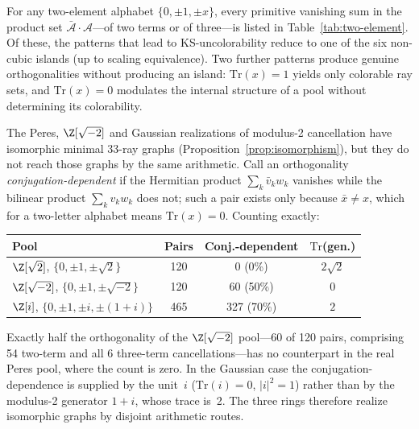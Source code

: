 
\begin{observation}\label{obs:two-element}
For any two-element alphabet $\{0, \pm 1, \pm x\}$, every primitive vanishing sum
in the product set $\bar{\mathcal{A}} \cdot \mathcal{A}$---of two terms or of
three---is listed in Table~\ref{tab:two-element}.  Of these, the patterns that
lead to KS-uncolorability reduce to one of the six non-cubic islands (up to
scaling equivalence).  Two further patterns produce genuine orthogonalities
without producing an island: $\mathrm{Tr}(x) = 1$ yields only colorable ray sets,
and $\mathrm{Tr}(x) = 0$ modulates the internal structure of a pool without
determining its colorability.
\end{observation}

\begin{observation}
\label{obs:conjugation-dependence}
The Peres, $\Z[\sqrt{-2}]$ and Gaussian realizations of modulus-2 cancellation
have isomorphic minimal 33-ray graphs (Proposition~\ref{prop:isomorphism}), but
they do not reach those graphs by the same arithmetic.  Call an orthogonality
\emph{conjugation-dependent} if the Hermitian product $\sum_k \bar v_k w_k$
vanishes while the bilinear product $\sum_k v_k w_k$ does not; such a pair exists
only because $\bar x \neq x$, which for a two-letter alphabet means
$\mathrm{Tr}(x) = 0$.  Counting exactly:

\medskip
\begin{center}
\begin{tabular}{lccc}
\hline
Pool & Pairs & Conj.-dependent & $\mathrm{Tr}$(gen.) \\
\hline
$\Z[\sqrt{2}]$, $\{0,\pm1,\pm\sqrt2\}$   & 120 & 0 \phantom{00}(0\%)  & $2\sqrt2$ \\
$\Z[\sqrt{-2}]$, $\{0,\pm1,\pm\sqrt{-2}\}$ & 120 & 60 \phantom{0}(50\%) & $0$ \\
$\Z[i]$, $\{0,\pm1,\pm i,\pm(1{+}i)\}$   & 465 & 327 (70\%) & $2$ \\
\hline
\end{tabular}
\end{center}
\medskip

\noindent Exactly half the orthogonality of the $\Z[\sqrt{-2}]$ pool---60 of 120
pairs, comprising 54 two-term and all 6 three-term cancellations---has no
counterpart in the real Peres pool, where the count is zero.  In the Gaussian
case the conjugation-dependence is supplied by the unit~$i$
($\mathrm{Tr}(i) = 0$, $|i|^2 = 1$) rather than by the modulus-2 generator
$1+i$, whose trace is~2.  The three rings therefore realize isomorphic graphs by
disjoint arithmetic routes.
\end{observation}


